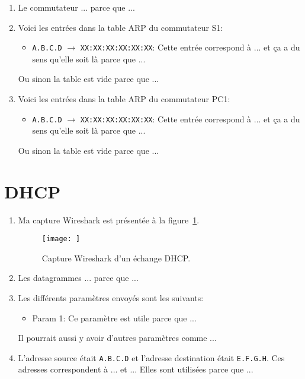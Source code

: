 \documentclass[]{article}
\begin{document}
\begin{enumerate}
    \item Le commutateur ... parce que ...
    \item Voici les entrées dans la table ARP du commutateur S1:
    
    \begin{itemize}
        \item \texttt{A.B.C.D} $\rightarrow$ \texttt{XX:XX:XX:XX:XX:XX}: Cette entrée correspond
              à ... et ça a du sens qu'elle soit là parce que ...
    \end{itemize}

    Ou sinon la table est vide parce que ...
    \item Voici les entrées dans la table ARP du commutateur PC1:
    
    \begin{itemize}
        \item \texttt{A.B.C.D} $\rightarrow$ \texttt{XX:XX:XX:XX:XX:XX}: Cette entrée correspond
              à ... et ça a du sens qu'elle soit là parce que ...
    \end{itemize}

    Ou sinon la table est vide parce que ...
\end{enumerate}

\section*{DHCP}

\begin{enumerate}
    \item Ma capture Wireshark est présentée à la figure~\ref{fig:wireshark-dhcp}.

    \begin{figure} 
        \centering
        \texttt{[image: ]} %
        \caption[]{Capture Wireshark d'un échange DHCP.}
        \label{fig:wireshark-dhcp}
    \end{figure}

    \item Les datagrammes ... parce que ...

    \item Les différents paramètres envoyés sont les suivants:

    \begin{itemize}
        \item Param 1: Ce paramètre est utile parce que ...
    \end{itemize}

    Il pourrait aussi y avoir d'autres paramètres comme ...

    \item L'adresse source était \texttt{A.B.C.D} et l'adresse destination était
          \texttt{E.F.G.H}. Ces adresses correspondent à ... et ... Elles sont
          utilisées parce que ...

\end{enumerate}
\end{document}

